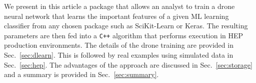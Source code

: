 We present in this article a package that allows an analyst to
train a drone neural network that learns the important features of a
given ML learning classifier from any chosen package such as SciKit-Learn or Keras.
The resulting parameters are then fed into a {\tt C++} algorithm that
performs execution in HEP production environments. The details of the
drone training are provided in Sec.~\ref{sec:dlearn}. This is followed
by real examples using simulated data in Sec.~\ref{sec:hep}. The advantages
of the approach are discussed in Sec.~\ref{sec:storage} and a summary is
provided in Sec.~\ref{sec:summary}.
